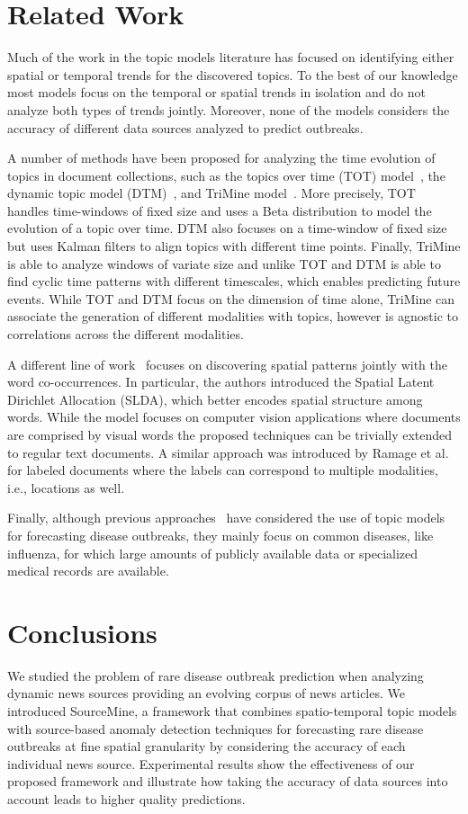 \documentclass[conference]{IEEEtran}
\newcommand{\fullmodel}{{{\sf SourceMine}}\xspace}
\begin{document}
\section{Related Work}
\label{sec:related_work}
Much of the work in the topic models literature has focused on identifying either spatial or temporal trends for the discovered topics. To the best of our knowledge most models focus on the temporal or spatial trends in isolation and do not analyze both types of trends jointly.  Moreover, none of the models considers the accuracy of different data sources analyzed to predict outbreaks.

A number of methods have been proposed for analyzing the time evolution of topics in document collections, such as the topics over time (TOT) model~\cite{wang:2006}, the dynamic topic model (DTM)~\cite{blei:2006}, and TriMine model~\cite{matsubara:2012}.  More precisely, TOT handles time-windows of fixed size and uses a Beta distribution to model the evolution of a topic over time. DTM  also focuses on a time-window of fixed size but uses Kalman filters to align topics with different time points. Finally, TriMine is able to analyze windows of variate size and unlike TOT and DTM is able to find cyclic time patterns with different timescales, which enables predicting future events. While TOT and DTM focus on the dimension of time alone, TriMine can associate the generation of different modalities with topics, however is agnostic to correlations across the different modalities.

A different line of work~\cite{wang:2007} focuses on discovering spatial patterns jointly with the word co-occurrences. In particular, the authors introduced the Spatial Latent Dirichlet Allocation (SLDA), which better encodes spatial structure among words. While the model focuses on computer vision applications where documents are comprised by visual words the proposed techniques can be trivially extended to regular text documents. A similar approach was introduced by Ramage et al.~\cite{ramage:2009} for labeled documents where the labels can correspond to multiple modalities, i.e., locations as well.

Finally, although previous approaches~\cite{paul:11, sadilek:2012, rider:2013} have considered the use of topic models for forecasting disease outbreaks, they mainly focus on common diseases, like influenza, for which large amounts of publicly available data or specialized medical records are available. 

\section{Conclusions}
\label{sec:conclusion}
We studied the problem of rare disease outbreak prediction when analyzing dynamic news sources providing an evolving corpus of news articles. We introduced \fullmodel, a framework that combines spatio-temporal topic models with source-based anomaly detection techniques for forecasting rare disease outbreaks at fine spatial granularity by considering the accuracy of each individual news source. Experimental results show the effectiveness of our proposed framework and illustrate how taking the accuracy of data sources into account leads to higher quality predictions.
\end{document}

